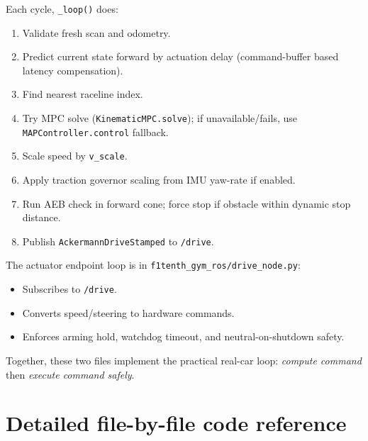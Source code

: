 \documentclass[11pt]{article}
\begin{document}
Each cycle, \texttt{\_loop()} does:
\begin{enumerate}
  \item Validate fresh scan and odometry.
  \item Predict current state forward by actuation delay (command-buffer based latency compensation).
  \item Find nearest raceline index.
  \item Try MPC solve (\texttt{KinematicMPC.solve}); if unavailable/fails, use \texttt{MAPController.control} fallback.
  \item Scale speed by \texttt{v\_scale}.
  \item Apply traction governor scaling from IMU yaw-rate if enabled.
  \item Run AEB check in forward cone; force stop if obstacle within dynamic stop distance.
  \item Publish \texttt{AckermannDriveStamped} to \texttt{/drive}.
\end{enumerate}

The actuator endpoint loop is in \texttt{f1tenth\_gym\_ros/drive\_node.py}:
\begin{itemize}
  \item Subscribes to \texttt{/drive}.
  \item Converts speed/steering to hardware commands.
  \item Enforces arming hold, watchdog timeout, and neutral-on-shutdown safety.
\end{itemize}

Together, these two files implement the practical real-car loop: \emph{compute command} then \emph{execute command safely}.

\section{Detailed file-by-file code reference}
\end{document}

